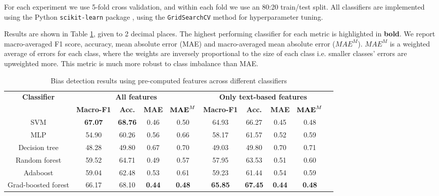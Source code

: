 For each experiment we use 5-fold cross validation, and within each fold we use an 80:20 train/test split. All classifiers are implemented using the Python \texttt{scikit-learn} package \cite{sklearn}, using the \texttt{GridSearchCV} method for hyperparameter tuning.

Results are shown in Table \ref{tab:nmr-ensemble-results}, given to 2 decimal places. The highest performing classifier for each metric is highlighted in \textbf{bold}. We report macro-averaged F1 score, accuracy, mean absolute error (MAE) and macro-averaged mean absolute error ($ MAE^M $). $ MAE^M $ is a weighted average of errors for each class, where the weights are inversely proportional to the size of each class i.e. smaller classes' errors are upweighted more. This metric is much more robust to class imbalance than MAE.

\begin{table}[h]
    \centering
    \small
    \begin{adjustbox}{width=1.1\textwidth,center}
    \begin{tabular}{|c|c|c|c|c|c|c|c|c|c|}
        \hline
        \textbf{Classifier} & \multicolumn{4}{|c|}{\textbf{All features}} & \multicolumn{4}{|c|}{\textbf{Only text-based features}} \\
         & \textbf{Macro-F1} & \textbf{Acc.} & \textbf{MAE} & $ \textrm{\textbf{MAE}}^M $ & \textbf{Macro-F1} & \textbf{Acc.} & \textbf{MAE} & $ \textrm{\textbf{MAE}}^M $ \\
         \hline
         SVM & \textbf{67.07} & \textbf{68.76} & 0.46 & 0.50 & 64.93 & 66.27 & 0.45 & 0.48  \\
         MLP & 54.90 & 60.26 & 0.56 & 0.66 & 58.17 & 61.57 & 0.52 & 0.59 \\
         Decision tree & 48.28 & 49.80 & 0.67 & 0.70 & 49.03 & 49.80 & 0.70 & 0.71 \\
         \hline
         Random forest & 59.52 & 64.71 & 0.49 & 0.57 & 57.95 & 63.53 & 0.51 & 0.60 \\
         Adaboost & 59.04 & 62.48 & 0.53 & 0.61 & 59.23 & 61.44 & 0.54 & 0.59 \\
         Grad-boosted forest & 66.17 & 68.10 & \textbf{0.44} & \textbf{0.48} & \textbf{65.85} & \textbf{67.45} & \textbf{0.44} & \textbf{0.48} \\
         \hline
    \end{tabular}
    \end{adjustbox}
    \caption{Bias detection results using pre-computed features across different classifiers}
    \label{tab:nmr-ensemble-results}
\end{table}

